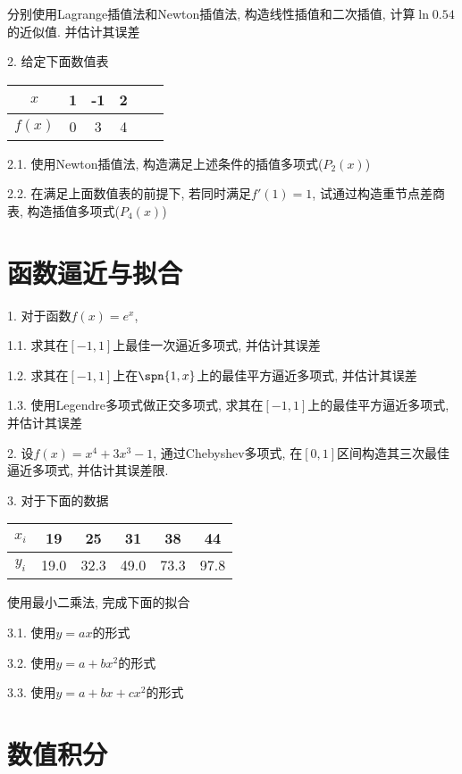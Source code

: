 分别使用Lagrange插值法和Newton插值法, 构造线性插值和二次插值, 计算$\ln0.54$的近似值. 并估计其误差

2. 给定下面数值表
\begin{table}[h!]
    \begin{tabular}{c|ccccc}
        \hline
        $x$&1&-1&2\\
        \hline
        $f(x)$&0&3&4\\
        \hline
    \end{tabular}
\end{table}

2.1. 使用Newton插值法, 构造满足上述条件的插值多项式($P_2(x)$)

2.2. 在满足上面数值表的前提下, 若同时满足$f'(1)=1$, 试通过构造重节点差商表, 构造插值多项式($P_4(x)$)

\section*{函数逼近与拟合}

1. 对于函数$f(x)=e^x$, 

1.1. 求其在$[-1,1]$上最佳一次逼近多项式, 并估计其误差

1.2. 求其在$[-1,1]$上在$\spn{1,x}$上的最佳平方逼近多项式, 并估计其误差

1.3. 使用Legendre多项式做正交多项式, 求其在$[-1,1]$上的最佳平方逼近多项式, 并估计其误差

2. 设$f(x)=x^4+3x^3-1$, 通过Chebyshev多项式, 在$[0,1]$区间构造其三次最佳逼近多项式, 并估计其误差限.

3. 对于下面的数据

\begin{table}[h!]
    \begin{tabular}{c|ccccc}
        \hline
        $x_i$&19&25&31&38&44\\
        \hline
        $y_i$&19.0&32.3&49.0&73.3&97.8\\
        \hline
    \end{tabular}
\end{table}

使用最小二乘法, 完成下面的拟合

3.1. 使用$y=ax$的形式

3.2. 使用$y=a+bx^2$的形式

3.3. 使用$y=a+bx+cx^2$的形式

\section*{数值积分}

